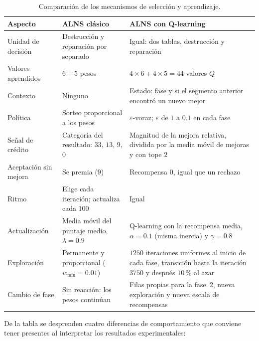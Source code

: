 \begin{table}[H]
\centering
\small
\caption{Comparación de los mecanismos de selección y aprendizaje.}
\label{tab:comparacion}
\begin{tabularx}{\textwidth}{@{}l L L@{}}
\toprule
Aspecto & ALNS clásico & ALNS con Q-learning \\
\midrule
Unidad de decisión & Destrucción y reparación por separado & Igual: dos tablas, destrucción y reparación \\
Valores aprendidos & $6+5$ pesos & $4\times 6+4\times 5=44$ valores $Q$ \\
Contexto & Ninguno & Estado: fase y si el segmento anterior encontró un nuevo mejor \\
Política & Sorteo proporcional a los pesos & $\varepsilon$-voraz; $\varepsilon$ de $1$ a $0.1$ en cada fase \\
Señal de crédito & Categoría del resultado: $33$, $13$, $9$, $0$ & Magnitud de la mejora relativa, dividida por la media móvil de mejoras y con tope $2$ \\
Aceptación sin mejora & Se premia ($9$) & Recompensa $0$, igual que un rechazo \\
Ritmo & Elige cada iteración; actualiza cada $100$ & Igual \\
Actualización & Media móvil del puntaje medio, $\lambda=0.9$ & Q-learning con la recompensa media, $\alpha=0.1$ (misma inercia) y $\gamma=0.8$ \\
Exploración & Permanente y proporcional ($w_{\min}=0.01$) & $1250$ iteraciones uniformes al inicio de cada fase, transición hasta la iteración $3750$ y después $10$\,\% al azar \\
Cambio de fase & Sin reacción: los pesos continúan & Filas propias para la fase~2, nueva exploración y nueva escala de recompensas \\
\bottomrule
\end{tabularx}
\end{table}

De la tabla se desprenden cuatro diferencias de comportamiento que conviene tener presentes al
interpretar los resultados experimentales:

